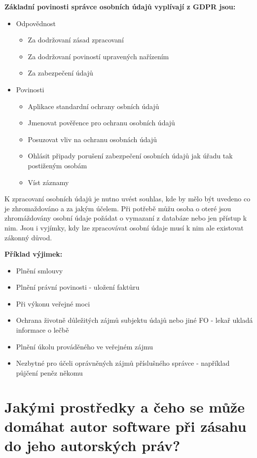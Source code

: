 \documentclass[12pt,a4paper,czech]{article}
\newcommand{\nadpis}[1]{{\section{#1}}}
\begin{document}
\vspace{0.5cm} 
\noindent\textbf{Základní povinosti správce osobních údajů vyplívají z GDPR jsou:}
\begin{itemize}
    \item Odpovědnost
    \begin{itemize}
        \item Za dodržovaní zásad zpracovaní
        \item Za dodržovaní poviností upravených nařízením
        \item Za zabezpečení údajů
    \end{itemize}
    \item Povinosti
    \begin{itemize}
        \item Aplikace standardní ochrany osbních údajů
        \item Jmenovat pověřence pro ochranu osobních údajů
        \item Posuzovat vliv na ochranu osobnách údajů
        \item Ohlásit připady porušení zabezpečení osobních údajů jak úřadu tak postiženým osobám
        \item Víst záznamy
    \end{itemize}
\end{itemize}

K zpracovaní osobních údajů je nutno uvést souhlas, kde by mělo být uvedeno co je zhromaždováno a za jakým účelem. Při potřebě můžu osoba o oteré jsou zhromáždovány osobní údaje požádat o vymazaní z databáze nebo jen přístup k nim. Jsou i vyjímky, kdy lze zpracovávat osobní údaje musí k nim ale existovat zákonný důvod.

\newpage 
\noindent\textbf{Příklad výjimek:}
\begin{itemize}
    \item Plnění smlouvy
    \item Plnění právní povinosti - uložení faktůru
    \item Při výkonu veřejné moci
    \item Ochrana životně důležitých zájmů subjektu údajů nebo jiné FO - lekař ukladá informace o lečbě
    \item Plnění úkolu prováděného ve veřejném zájmu
    \item Nezbytné pro účeli oprávněných zájmů příslušného správce - například půjčení peněz někomu 
\end{itemize}

\vspace{0.3cm} \nadpis{Jakými prostředky a čeho se může domáhat autor software při zásahu do jeho autorských práv?}
\end{document}
